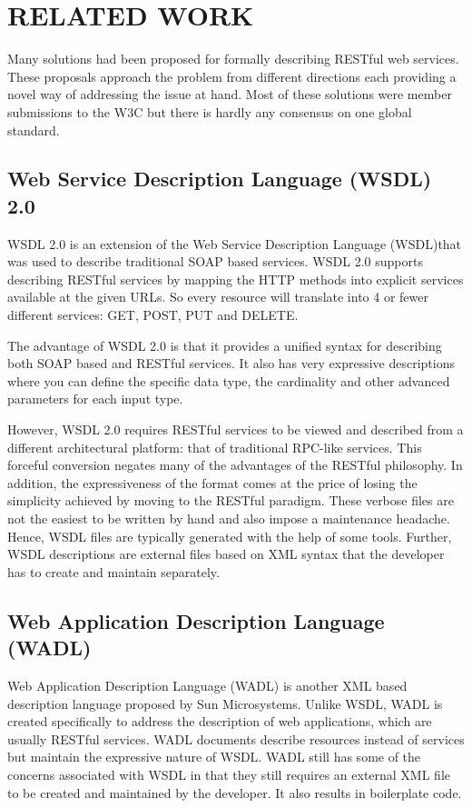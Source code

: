 \chapter{RELATED WORK}
\begin{spacing}{1.5}
Many solutions had been proposed for formally describing RESTful web services. These proposals approach the problem  from different directions each providing a novel way of addressing the issue at hand. Most of these solutions were member submissions to the W3C but there is hardly any consensus on one global standard.

\section{Web Service Description Language (WSDL) 2.0}
WSDL 2.0\cite{10} is an extension of the Web Service Description Language (WSDL)that was used to describe traditional SOAP based services. WSDL 2.0 supports describing RESTful services by mapping the HTTP methods into explicit services available at the given URLs. So every resource will translate into 4 or fewer different services: GET, POST, PUT and DELETE. 
      
The advantage of WSDL 2.0 is that it provides a unified syntax for describing both SOAP based and RESTful services. It also has very expressive descriptions where you can define the specific data type, the cardinality and other advanced parameters for each input type. 
   
However, WSDL 2.0 requires RESTful services to be viewed and described from a different architectural platform: that of traditional RPC-like services. This forceful conversion negates many of the advantages of the RESTful philosophy. In addition, the expressiveness of the format comes at the price of losing the simplicity achieved by moving to the RESTful paradigm. These verbose files are not the easiest to be written by hand and also impose a maintenance headache. Hence, WSDL files are typically generated with the help of some tools. Further, WSDL descriptions are external files based on XML syntax that the developer has to create and maintain separately. 

\section{Web Application Description Language (WADL)}
Web Application Description Language (WADL)\cite{11} is another XML based description language proposed by Sun Microsystems. Unlike WSDL, WADL is created specifically to address the description of web applications, which are usually RESTful services. WADL documents describe resources instead of services but maintain the expressive nature of WSDL. 
WADL still has some of the concerns associated with WSDL in that they still requires an external XML file to be created and maintained by the developer. It also results in boilerplate code. 


\end{spacing}
